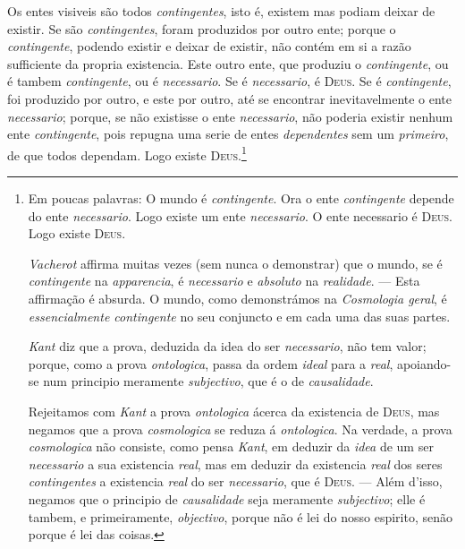  Os entes visiveis são todos \emph{contingentes}, isto é, existem mas podiam
deixar de existir. Se são \emph{contingentes}, foram produzidos por outro ente; porque o
\emph{contingente}, podendo existir e deixar de existir, não contém em si a razão
sufficiente da propria existencia. Este outro ente, que produziu o \emph{contingente},
ou é tambem \emph{contingente}, ou é \emph{necessario}. Se é \emph{necessario}, é
\textsc{Deus}. Se é \emph{contingente}, foi produzido por outro, e este por outro, até
se encontrar inevitavelmente o ente \emph{necessario}; porque, se não existisse o ente
\emph{necessario}, não poderia existir nenhum ente \emph{contingente}, pois repugna uma
serie de entes \emph{dependentes} sem um \emph{primeiro}, de que todos dependam. Logo
existe \textsc{Deus}.\footnote{Em poucas palavras: O mundo é \emph{contingente}. Ora o ente \emph{contingente} depende
do ente \emph{necessario}. Logo existe um ente \emph{necessario}. O ente necessario é
\textsc{Deus}. Logo existe \textsc{Deus}.

\emph{Vacherot} affirma muitas vezes (sem nunca o demonstrar) que o mundo,
se é \emph{contingente} na \emph{apparencia}, é \emph{necessario} e \emph{absoluto} na
\emph{realidade}. --- Esta affirmação é absurda. O mundo, como demonstrámos na
\emph{Cosmologia geral}, é \emph{essencialmente contingente} no seu conjuncto e em cada
uma das suas partes.

\emph{Kant} diz que a prova, deduzida da idea do ser \emph{necessario}, não tem valor;
porque, como a prova \emph{ontologica}, passa da ordem \emph{ideal} para a \emph{real},
apoiando-se num principio meramente \emph{subjectivo}, que é o de \emph{causalidade}.

Rejeitamos com \emph{Kant} a prova \emph{ontologica} ácerca da existencia de
\textsc{Deus}, mas negamos que a prova \emph{cosmologica} se reduza á
\emph{ontologica}. Na verdade, a prova \emph{cosmologica} não consiste, como pensa
\emph{Kant}, em deduzir da \emph{idea} de um ser \emph{necessario} a sua existencia
\emph{real}, mas em deduzir da existencia \emph{real} dos seres \emph{contingentes} a
existencia \emph{real} do ser \emph{necessario}, que é \textsc{Deus}. --- Além d'isso,
negamos que o principio de \emph{causalidade} seja meramente \emph{subjectivo}; elle é
tambem, e primeiramente, \emph{objectivo}, porque não é lei do nosso espirito, senão
porque é lei das coisas.}

